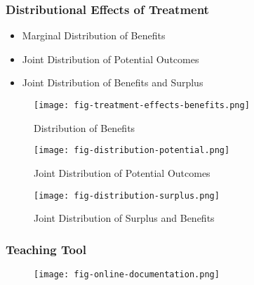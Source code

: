 \begin{frame}
\frametitle{Distributional Effects of Treatment}

\begin{itemize}
\item
  Marginal Distribution of Benefits
\item
  Joint Distribution of Potential Outcomes
\item
  Joint Distribution of Benefits and Surplus
\end{itemize}
\end{frame}


\begin{frame}

\begin{figure}[htp]\centering
	\caption{Distribution of Benefits}\label{Treatment Effects Benefits}\scalebox{0.35}
	{\texttt{[image: fig-treatment-effects-benefits.png]}}
\end{figure}

\end{frame}


\begin{frame}

\begin{figure}[htp]\centering
	\caption{Joint Distribution of Potential Outcomes}\label{Treatment Effects Benefits}\scalebox{0.80}
	{\texttt{[image: fig-distribution-potential.png]}}
\end{figure}

\end{frame}


\begin{frame}

\begin{figure}[htp]\centering
	\caption{Joint Distribution of Surplus and Benefits}\label{Treatment Effects Benefits}\scalebox{0.80}
	{\texttt{[image: fig-distribution-surplus.png]}}
\end{figure}

\end{frame}


\begin{frame}
\frametitle{Teaching Tool}

\begin{figure}[htp]\centering
	\texttt{[image: fig-online-documentation.png]}
\end{figure}

\end{frame}



